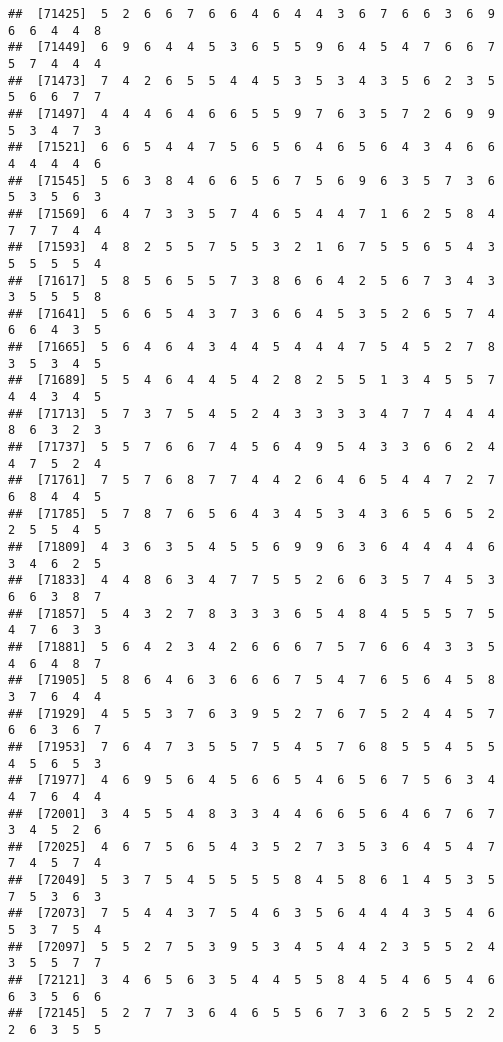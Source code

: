 \documentclass[
]{book}
\begin{document}
\begin{verbatim}
##  [71425]  5  2  6  6  7  6  6  4  6  4  4  3  6  7  6  6  3  6  9  6  6  4  4  8
##  [71449]  6  9  6  4  4  5  3  6  5  5  9  6  4  5  4  7  6  6  7  5  7  4  4  4
##  [71473]  7  4  2  6  5  5  4  4  5  3  5  3  4  3  5  6  2  3  5  5  6  6  7  7
##  [71497]  4  4  4  6  4  6  6  5  5  9  7  6  3  5  7  2  6  9  9  5  3  4  7  3
##  [71521]  6  6  5  4  4  7  5  6  5  6  4  6  5  6  4  3  4  6  6  4  4  4  4  6
##  [71545]  5  6  3  8  4  6  6  5  6  7  5  6  9  6  3  5  7  3  6  5  3  5  6  3
##  [71569]  6  4  7  3  3  5  7  4  6  5  4  4  7  1  6  2  5  8  4  7  7  7  4  4
##  [71593]  4  8  2  5  5  7  5  5  3  2  1  6  7  5  5  6  5  4  3  5  5  5  5  4
##  [71617]  5  8  5  6  5  5  7  3  8  6  6  4  2  5  6  7  3  4  3  3  5  5  5  8
##  [71641]  5  6  6  5  4  3  7  3  6  6  4  5  3  5  2  6  5  7  4  6  6  4  3  5
##  [71665]  5  6  4  6  4  3  4  4  5  4  4  4  7  5  4  5  2  7  8  3  5  3  4  5
##  [71689]  5  5  4  6  4  4  5  4  2  8  2  5  5  1  3  4  5  5  7  4  4  3  4  5
##  [71713]  5  7  3  7  5  4  5  2  4  3  3  3  3  4  7  7  4  4  4  8  6  3  2  3
##  [71737]  5  5  7  6  6  7  4  5  6  4  9  5  4  3  3  6  6  2  4  4  7  5  2  4
##  [71761]  7  5  7  6  8  7  7  4  4  2  6  4  6  5  4  4  7  2  7  6  8  4  4  5
##  [71785]  5  7  8  7  6  5  6  4  3  4  5  3  4  3  6  5  6  5  2  2  5  5  4  5
##  [71809]  4  3  6  3  5  4  5  5  6  9  9  6  3  6  4  4  4  4  6  3  4  6  2  5
##  [71833]  4  4  8  6  3  4  7  7  5  5  2  6  6  3  5  7  4  5  3  6  6  3  8  7
##  [71857]  5  4  3  2  7  8  3  3  3  6  5  4  8  4  5  5  5  7  5  4  7  6  3  3
##  [71881]  5  6  4  2  3  4  2  6  6  6  7  5  7  6  6  4  3  3  5  4  6  4  8  7
##  [71905]  5  8  6  4  6  3  6  6  6  7  5  4  7  6  5  6  4  5  8  3  7  6  4  4
##  [71929]  4  5  5  3  7  6  3  9  5  2  7  6  7  5  2  4  4  5  7  6  6  3  6  7
##  [71953]  7  6  4  7  3  5  5  7  5  4  5  7  6  8  5  5  4  5  5  4  5  6  5  3
##  [71977]  4  6  9  5  6  4  5  6  6  5  4  6  5  6  7  5  6  3  4  4  7  6  4  4
##  [72001]  3  4  5  5  4  8  3  3  4  4  6  6  5  6  4  6  7  6  7  3  4  5  2  6
##  [72025]  4  6  7  5  6  5  4  3  5  2  7  3  5  3  6  4  5  4  7  7  4  5  7  4
##  [72049]  5  3  7  5  4  5  5  5  5  8  4  5  8  6  1  4  5  3  5  7  5  3  6  3
##  [72073]  7  5  4  4  3  7  5  4  6  3  5  6  4  4  4  3  5  4  6  5  3  7  5  4
##  [72097]  5  5  2  7  5  3  9  5  3  4  5  4  4  2  3  5  5  2  4  3  5  5  7  7
##  [72121]  3  4  6  5  6  3  5  4  4  5  5  8  4  5  4  6  5  4  6  6  3  5  6  6
##  [72145]  5  2  7  7  3  6  4  6  5  5  6  7  3  6  2  5  5  2  2  2  6  3  5  5

\end{verbatim}
\end{document}
